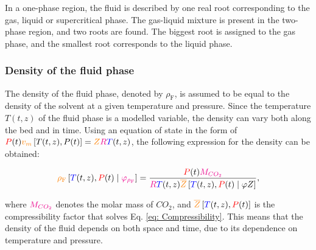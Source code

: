 \documentclass[../Article_Model_Parameters.tex]{subfiles}
\begin{document}
	In a one-phase region, the fluid is described by one real root corresponding to the gas, liquid or supercritical phase. The gas-liquid mixture is present in the two-phase region, and two roots are found. The biggest root is assigned to the gas phase, and the smallest root corresponds to the liquid phase.
	
	\subsubsection{Density of the fluid phase} \label{subsubsec: Fluid density}
	
	The density of the fluid phase, denoted by $\rho_{\text{F}}$, is assumed to be equal to the density of the solvent at a given temperature and pressure. Since the temperature $T(t,z)$ of the fluid phase is a modelled variable, the density can vary both along the bed and in time. Using an equation of state in the form of ${\color{red}P}(t) {\color{orange}v_m}\left[T(t,z),P(t)\right] = {\color{orange}Z}{\color{magenta}R}{\color{blue}T}(t,z)$, the following expression for the density can be obtained:
	
	{\footnotesize
		\begin{equation} \label{eq: Density}
			{\color{orange}\rho_{\text{F}}} \left[{\color{blue}T}(t,z),{\color{red}P}(t) \mid {\color{magenta}\varphi_{\rho_{\text{F}}}}\right] = \frac{{\color{red}P}(t) {\color{magenta}M_{CO_2}}}{{\color{magenta}R}{\color{blue}T}(t,z){\color{orange}\overline{Z}}\left[{\color{blue}T}(t,z),{\color{red}P}(t) \mid \varphi{Z}\right]},
	\end{equation}}
	
	where ${\color{magenta}M_{CO_2}}$ denotes the molar mass of $CO_2$, and ${\color{orange}\overline{Z}}\left[{\color{blue}T}(t,z), {\color{red}P}(t)\right]$ is the compressibility factor that solves Eq. \eqref{eq: Compressibility}. This means that the density of the fluid depends on both space and time, due to its dependence on temperature and pressure.
	
\end{document}
